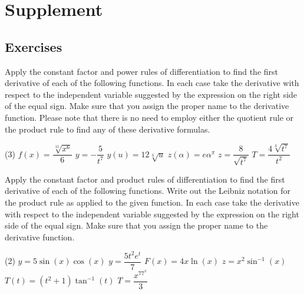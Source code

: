 \documentclass[10pt,oneside,]{book}
\theoremstyle{plain}
\theoremstyle{definition}
\numberwithin{equation}{section}
\newcommand{\fe}[2]{#1\mathopen{}\left(#2\right)\mathclose{}}
\begin{document}
\section[Supplement]{Supplement}\label{derivative-formulas-supplementary-exercises}
\typeout{************************************************}
\typeout{************************************************}
\subsection[Exercises]{Exercises}\label{exercises-42}
\hypertarget{exercisegroup-84}{\null}Apply the constant factor and power rules of differentiation to find the first derivative of each of the following functions.  In each case take the derivative with respect to the independent variable suggested by the expression on the right side of the equal sign.  Make sure that you assign the proper name to the derivative function.  Please note that there is no need to employ either the quotient rule or the product rule to find any of these derivative formulas.%
\par
\begin{exercisegroup}(3)
\exercise[1.]\hypertarget{exercise-401}{\null}\(\fe{f}{x}=\dfrac{\sqrt[11]{x^6}}{6}\)%
\exercise[2.]\hypertarget{exercise-402}{\null}\(y=-\dfrac{5}{t^7}\)%
\exercise[3.]\hypertarget{exercise-403}{\null}\(\fe{y}{u}=12\sqrt[3]{u}\)%
\exercise[4.]\hypertarget{exercise-404}{\null}\(\fe{z}{\alpha}=e\alpha^{\pi}\)%
\exercise[5.]\hypertarget{exercise-405}{\null}\(z=\dfrac{8}{\sqrt{t^7}}\)%
\exercise[6.]\hypertarget{exercise-406}{\null}\(T=\dfrac{4\sqrt[3]{t^7}}{t^2}\)%
\end{exercisegroup}
\par\smallskip\noindent
\hypertarget{exercisegroup-85}{\null}Apply the constant factor and product rules of differentiation to find the first derivative of each of the following functions.   Write out the Leibniz notation for the product rule as applied to the given function. In each case take the derivative with respect to the independent variable suggested by the expression on the right side of the equal sign.  Make sure that you assign the proper name to the derivative function.%
\par
\begin{exercisegroup}(2)
\exercise[7.]\hypertarget{exercise-407}{\null}\(y=5\fe{\sin}{x}\fe{\cos}{x}\)%
\exercise[8.]\hypertarget{exercise-408}{\null}\(y=\dfrac{5t^2e^t}{7}\)%
\exercise[9.]\hypertarget{exercise-409}{\null}\(\fe{F}{x}=4x\fe{\ln}{x}\)%
\exercise[10.]\hypertarget{exercise-410}{\null}\(z=x^2\fe{\sin^{-1}}{x}\)%
\exercise[11.]\hypertarget{exercise-411}{\null}\(\fe{T}{t}=(t^2+1)\fe{\tan^{-1}}{t}\)%
\exercise[12.]\hypertarget{exercise-412}{\null}\(T=\dfrac{x^77^x}{3}\)%
\end{exercisegroup}
\end{document}
